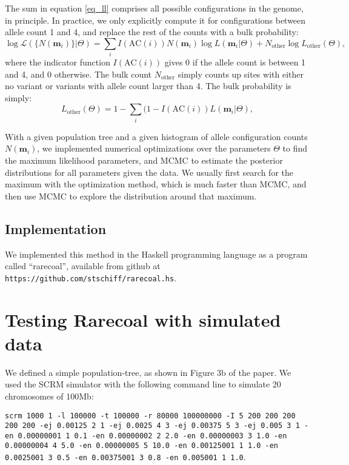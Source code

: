 \documentclass[a4paper]{article}
\begin{document}
The sum in equation \ref{eq_ll} comprises all possible configurations in the genome, in principle. In practice, we only explicitly compute it for configurations between allele count 1 and 4, and replace the rest of the counts with a bulk probability:
\begin{equation}
    \label{eq_ll2}
	\log\mathcal{L}(\{N(\mathbf{m}_i)\}|\Theta) = \sum_i I(\mathrm{AC}(i)) N(\mathbf{m}_i) \log L(\mathbf{m}_i|\Theta) + N_\mathrm{other} \log L_\mathrm{other}(\Theta),
\end{equation}
where the indicator function $I(\mathrm{AC}(i))$ gives 0 if the allele count is between 1 and 4, and $0$ otherwise. The bulk count $N_\mathrm{other}$ simply counts up sites with either no variant or variants with allele count larger than 4. The bulk probability is simply:
\begin{equation}
    L_\mathrm{other}(\Theta) = 1 - \sum_i (1 - I(\mathrm{AC}(i)) L(\mathbf{m}_i|\Theta),
\end{equation}

With a given population tree and a given histogram of allele configuration counts $N(\mathbf{m}_i)$, we implemented numerical optimizations over the parameters $\Theta$ to find the maximum likelihood parameters, and MCMC to estimate the posterior distributions for all parameters given the data. We usually first search for the maximum with the optimization method, which is much faster than MCMC, and then use MCMC to explore the distribution around that maximum.

\subsection*{Implementation}

We implemented this method in the Haskell programming language as a program called ``rarecoal'', available from github at \texttt{https://github.com/stschiff/rarecoal.hs}.

\section*{Testing Rarecoal with simulated data}
We defined a simple population-tree, as shown in Figure 3b of the paper. We used the SCRM simulator \cite{Staab:2015by} with the following command line to simulate 20 chromosomes of 100Mb:

\texttt{scrm 1000 1 -l 100000 -t 100000 -r 80000 100000000 -I 5 200 200 200 200 200 -ej 0.00125 2 1 -ej 0.0025 4 3 -ej 0.00375 5 3 -ej 0.005 3 1 -en 0.00000001 1 0.1 -en 0.00000002 2 2.0 -en 0.00000003 3 1.0 -en 0.00000004 4 5.0 -en 0.00000005 5 10.0 -en 0.00125001 1 1.0 -en 0.0025001 3 0.5 -en 0.00375001 3 0.8 -en 0.005001 1 1.0}.
\end{document}
